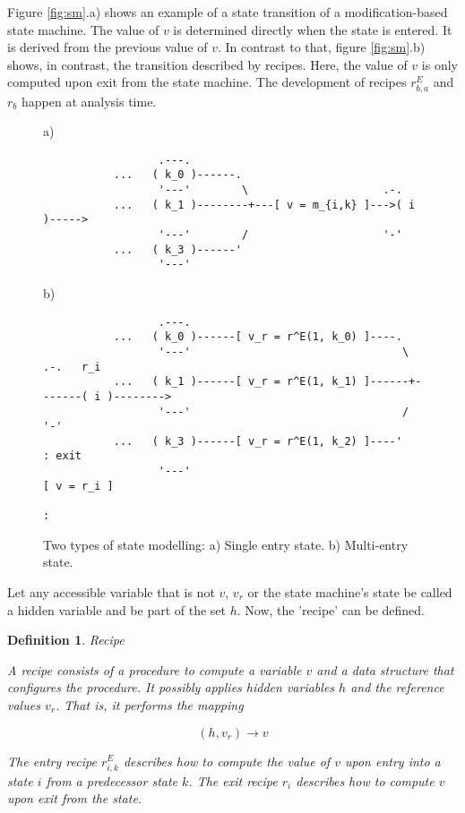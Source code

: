 \documentclass[12pt,a4paper]{scrartcl}
\newtheorem{definition}{Definition}
\begin{document}
Figure \ref{fig:sm}.a) shows an example of a state transition of a modification-based
state machine. The value of $v$ is determined directly when the state is entered.
It is derived from the previous value of $v$. In contrast to that, figure \ref{fig:sm}.b)
shows, in contrast, the transition described by recipes. Here, the value of $v$ is
only computed upon exit from the state machine. The development of recipes $r^E_{b,a}$ 
and $r_b$ happen at analysis time. 

\begin{figure}[htbp] \leavevmode \label{fig:se-vs-me}
a)

\begin{verbatim}
                  .---.  
           ...   ( k_0 )------.
                  '---'        \                     .-.
           ...   ( k_1 )--------+---[ v = m_{i,k} ]--->( i )----->   
                  '---'        /                     '-'
           ...   ( k_3 )------'       
                  '---'
\end{verbatim}
     
b)
     
\begin{verbatim}
                  .---.
           ...   ( k_0 )------[ v_r = r^E(1, k_0) ]----.
                  '---'                                 \         .-.   r_i
           ...   ( k_1 )------[ v_r = r^E(1, k_1) ]------+-------( i )-------->  
                  '---'                                 /         '-'
           ...   ( k_3 )------[ v_r = r^E(1, k_2) ]----'           : exit
                  '---'                                       [ v = r_i ]
                                                                   :
\end{verbatim}
\caption{Two types of state modelling: a) Single entry state. 
b) Multi-entry state.}
\end{figure}

Let any accessible variable that is not $v$, $v_r$ or the state machine's state
be called a hidden variable and be part of the set $h$.  Now, the 'recipe' can
be defined.

\begin{definition} Recipe 

    A recipe consists of a procedure to compute a variable $v$ and a data
    structure that configures the procedure. It possibly applies hidden
    variables $h$ and the reference values $v_r$. That is, it performs the
    mapping

    \begin{equation} \label{eq:recipe-procedure}
        (h, v_r) \rightarrow v 
    \end{equation}

    The entry recipe $r^E_{i,k}$ describes how to compute the value of $v$ upon
    entry into a state $i$ from a predecessor state $k$. The exit recipe $r_i$
    describes how to compute $v$ upon exit from the state.

\end{definition}
\end{document}
